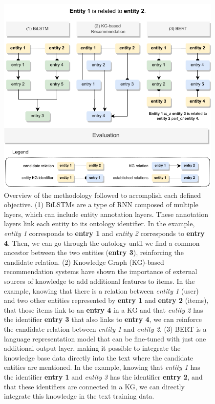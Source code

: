 \begin{figure}[H]
\centering
\includegraphics[width=\linewidth]{images/chapter_1/general_metodology.pdf}
\caption[Overview of the General Methodology]{Overview of the methodology followed to accomplish each defined objective. (1) BiLSTMs are a type of RNN composed of multiple layers, which can include entity annotation layers. These annotation layers link each entity to its ontology identifier. In the example, \textit{entity 1} corresponds to \textbf{entry 1} and \textit{entity 2} corresponds to \textbf{entry 4}. Then, we can go through the ontology until we find a common ancestor between the two entities (\textbf{entry 3}), reinforcing the candidate relation. (2) Knowledge Graph (KG)-based recommendation systems have shown the importance of external sources of knowledge to add additional features to items. In the example, knowing that there is a relation between \textit{entity 1} (user) and two other entities represented by \textbf{entry 1} and \textbf{entry 2} (items), that those items link to an \textbf{entry 4} in a KG and that \textit{entity 2} has the identifier \textbf{entry 3} that also links to \textbf{entry 4}, we can reinforce the candidate relation between \textit{entity 1} and \textit{entity 2}. (3) BERT is a language representation model that can be fine-tuned with just one additional output layer, making it possible to integrate the knowledge base data directly into the text where the candidate entities are mentioned. In the example, knowing that \textit{entity 1} has the identifier \textbf{entry 1} and \textit{entity 3} has the identifier \textbf{entry 2}, and that these identifiers are connected in a KG, we can directly integrate this knowledge in the text training data.} \label{fig1}
\end{figure}

